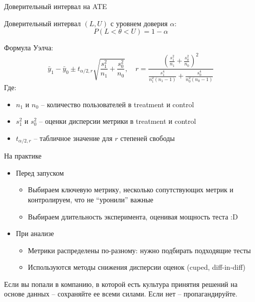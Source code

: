 \documentclass[11pt,aspectratio=169,handout]{beamer}
\begin{document}
\begin{frame}{Доверительный интервал на ATE}

Доверительный интервал $(L, U)$ с уровнем доверия $\alpha$:
\[
P(L < \theta < U) = 1 - \alpha
\]

Формула Уэлча:
\[
\bar y_1 - \bar y_0 \pm t_{\alpha/2,r} \sqrt{\frac{s_1^2}{n_1} + \frac{s_0^2}{n_0}}, \quad
r = \frac{ \left( \frac{s_1^2}{n_1} + \frac{s_0^2}{n_0} \right)^2 }{ \frac{s_1^4}{n_1^2 (n_1 - 1)} + \frac{s_0^4}{n_0^2 (n_0 - 1)} }
\]
Где:
\begin{itemize}
\item $n_1$ и $n_0$ -- количество пользователей в treatment и control
\item $s_1^2$ и $s_0^2$ -- оценки дисперсии метрики в treatment и control
\item $t_{\alpha/2,r}$ -- табличное значение для $r$ степеней свободы
\end{itemize}

\end{frame}

\begin{frame}{На практике}

\begin{itemize}

\item Перед запуском
\begin{itemize}
\item Выбираем ключевую метрику, несколько сопутствующих метрик и контролируем, что не ``уронили'' важные
\item Выбираем длительность эксперимента, оценивая мощность теста :D
\end{itemize} 

\item При анализе
\begin{itemize}
\item Метрики распределены по-разному: нужно подбирать подходящие тесты
\item Используются методы снижения дисперсии оценок (cuped, diff-in-diff)
\end{itemize}

\end{itemize}

\vfill

\begin{tcolorbox}[colback=info!5,colframe=info!80]
Если вы попали в компанию, в которой есть культура принятия решений на основе данных -- сохраняйте ее всеми силами. Если нет -- пропагандируйте.
\end{tcolorbox}

\end{frame}
\end{document}
